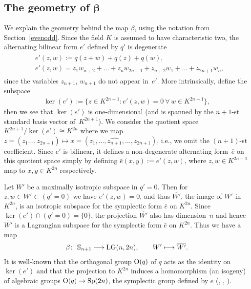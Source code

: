 \documentclass[pdftex]{sigma}
\newcommand{\bS}{{\mathbb S}}
\numberwithin{equation}{section}
\begin{document}
\subsection[The geometry of $\beta$]{The geometry of $\boldsymbol{\beta}$}\label{geob}
We explain the geometry behind the map $\beta$, using the notation from Section~\ref{evenodd}. Since the field $K$ is assumed to have characteristic two, the alternating bilinear form $e'$ defined by $q'$ is degenerate
\begin{gather*}\begin{split}
& e'(z,w) := q(z+w) + q(z) + q(w),\\ & e'(z,w) = z_1w_{n+2}+\dots+z_nw_{2n+1} + z_{n+2}w_1+\dots+z_{2n+1}w_n,\end{split}
\end{gather*}
since the variables $z_{n+1}$, $w_{n+1}$ do not appear in~$e'$. More intrinsically, define the subspace
\begin{gather*}
\ker(e') := \big\{z\in K^{2n+1}\colon e'(z,w)=0 \ \forall\, w\in K^{2n+1} \big\},
\end{gather*}
then we see that $\ker(e')$ is one-dimensional (and is spanned by the $n+1$-st standard basis vector of~$K^{2n+1}$). We consider the quotient space $K^{2n+1}/\ker(e')\cong K^{2n}$ where we map $z=(z_1\ldots,z_{2n+1})\mapsto x=(z_1,\ldots, \widehat{z_{n+1}},\ldots,z_{2n+1})$, i.e., we omit the $(n+1)$-st coefficient. Since $e'$ is bilinear, it defines a non-degenerate alternating form~$\bar{e}$ on this quotient space simply by defining $\bar{e}(x,y):=e'(z,w)$, where $z,w\in K^{2n+1}$ map to $x,y\in K^{2n}$ respectively.

Let $W'$ be a maximally isotropic subspace in $q'=0$. Then for $z,w\in W'\subset (q'=0)$ we have $e'(z,w)=0$, and thus $\overline{W'}$, the image of $W'$ in $K^{2n}$, is an isotropic subspace for the symplectic form $\bar{e}$ on $K^{2n}$. Since $\ker(e')\cap (q'=0)=\{0\}$, the projection $\overline{W'}$ also has dimension~$n$ and hence~$\overline{W'}$ is a Lagrangian subspace for the symplectic form $\bar{e}$ on $K^{2n}$. Thus we have a map
\begin{gather*}
\beta\colon \ \bS_{n+1} \longrightarrow {\rm LG}(n,2n),\qquad W' \longmapsto \overline{W'}.
\end{gather*}
It is well-known that the orthogonal group ${\rm O}(q)$ of $q$ acts as the identity on $\ker(e')$ and that the projection to $K^{2n}$ induces a homomorphism (an isogeny) of algebraic groups ${\rm O}(q)\rightarrow {\rm Sp}(2n)$, the symplectic group defined by $\bar{e}$ (\cite[Section~4.11]{Steinberg}, \cite{Milne}, \cite[Section~7.1, Remark~7.1.6]{CGP}).
\end{document}
